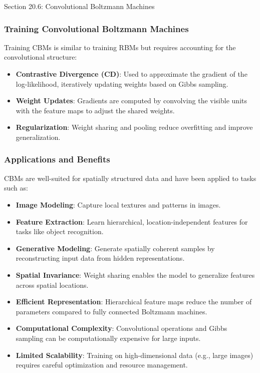 \begin{notes}{Section 20.6: Convolutional Boltzmann Machines}
    \subsubsection*{Training Convolutional Boltzmann Machines}
    
    Training CBMs is similar to training RBMs but requires accounting for the convolutional structure:
    \begin{itemize}
        \item \textbf{Contrastive Divergence (CD)}: Used to approximate the gradient of the log-likelihood, iteratively updating weights based on Gibbs sampling.
        \item \textbf{Weight Updates}: Gradients are computed by convolving the visible units with the feature maps to adjust the shared weights.
        \item \textbf{Regularization}: Weight sharing and pooling reduce overfitting and improve generalization.
    \end{itemize}
    
    \subsubsection*{Applications and Benefits}
    
    CBMs are well-suited for spatially structured data and have been applied to tasks such as:
    \begin{itemize}
        \item \textbf{Image Modeling}: Capture local textures and patterns in images.
        \item \textbf{Feature Extraction}: Learn hierarchical, location-independent features for tasks like object recognition.
        \item \textbf{Generative Modeling}: Generate spatially coherent samples by reconstructing input data from hidden representations.
    \end{itemize}
    
    \begin{highlight}
        \begin{itemize}
            \item \textbf{Spatial Invariance}: Weight sharing enables the model to generalize features across spatial locations.
            \item \textbf{Efficient Representation}: Hierarchical feature maps reduce the number of parameters compared to fully connected Boltzmann machines.
            \item \textbf{Computational Complexity}: Convolutional operations and Gibbs sampling can be computationally expensive for large inputs.
            \item \textbf{Limited Scalability}: Training on high-dimensional data (e.g., large images) requires careful optimization and resource management.
        \end{itemize}
    \end{highlight}
    

\end{notes}
